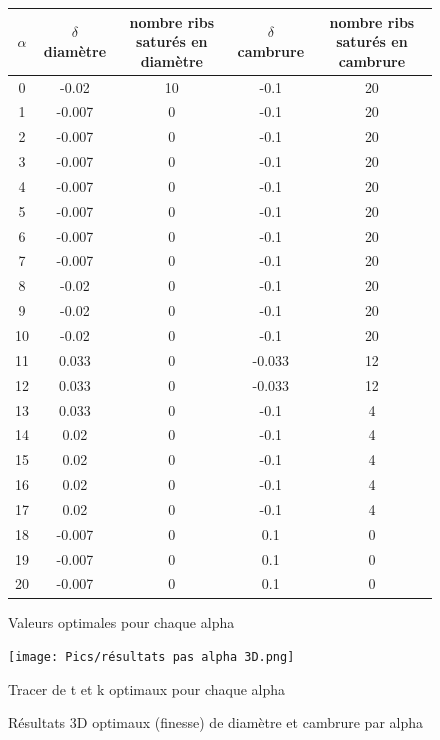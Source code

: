 \documentclass[conference]{IEEEtran}
\begin{document}
\begin{figure}[H]
    \centering
    \begin{minipage}[b]{0.45\textwidth}
        \centering
        \begin{tabular}{|c|c|c|c|c|}
            \hline
            \textbf{$\alpha$} & \textbf{\parbox{1.5cm}{\centering $\delta$diamètre}} & \textbf{\parbox{1.5cm}{\centering nombre ribs saturés en diamètre}} & \textbf{\parbox{1.5cm}{\centering $\delta$cambrure}} & \textbf{\parbox{1.5cm}{\centering nombre ribs saturés en cambrure}}\\
            \hline
            0 & -0.02 & 10 & -0.1 & 20\\
            1 & -0.007 & 0 & -0.1 & 20\\
            2 & -0.007 & 0 & -0.1 & 20\\
            3 & -0.007 & 0 & -0.1 & 20 \\
            4 & -0.007 & 0 & -0.1 & 20 \\
            5 & -0.007 & 0 & -0.1 & 20 \\
            6 & -0.007 & 0 & -0.1 & 20  \\
            7 & -0.007 & 0 & -0.1 & 20 \\
            8 & -0.02 & 0 & -0.1 & 20 \\
            9 & -0.02 & 0 & -0.1 & 20 \\
            10 & -0.02 & 0 & -0.1 & 20 \\
            11 & 0.033 & 0 & -0.033 & 12 \\
            12 & 0.033 & 0 & -0.033 & 12 \\
            13 & 0.033 & 0 & -0.1 & 4 \\
            14 & 0.02 & 0 & -0.1 & 4 \\
            15 & 0.02 & 0 & -0.1 & 4 \\
            16 & 0.02 & 0 & -0.1 & 4 \\
            17 & 0.02 & 0 & -0.1 & 4 \\
            18 & -0.007 & 0 & 0.1 & 0 \\
            19 & -0.007 & 0 & 0.1 & 0 \\
            20 & -0.007 & 0 & 0.1 & 0 \\
            \hline
        \end{tabular}
        \caption{Valeurs optimales pour chaque alpha}
        \label{fig:table}
    \end{minipage}
    \hfill 
    \begin{minipage}[b]{0.45\textwidth}
        \centering
        \texttt{[image: Pics/résultats pas alpha 3D.png]}
        \caption{Tracer de t et k optimaux pour chaque alpha}
        \label{fig:graph}
    \end{minipage}
    \caption{Résultats 3D optimaux (finesse) de diamètre et cambrure par alpha}
    \label{fig:opti alpha 3d}
\end{figure}
\end{document}
